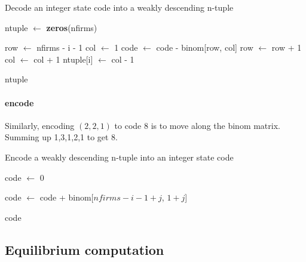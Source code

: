 \documentclass[12pt]{article}[margin=1in]
\begin{document}
\begin{algorithm}[!htbp]
    \caption{Decode an integer state code into a weakly descending n-tuple}
    \begin{algorithmic}[1]
        \State ntuple $\gets$ \textbf{zeros}(nfirms) 

        \State row $\gets$ nfirms - i - 1
        \State col $\gets$ 1
        \State code $\gets$ code - binom[row, col]
        \State row $\gets$ row + 1
        \State col $\gets$ col + 1
        \EndWhile
        \State ntuple[i] $\gets$ col - 1
        \EndFor

        \State \Return ntuple
        \EndFunction
    \end{algorithmic}
\end{algorithm}

\paragraph{encode}Similarly, encoding $(2,2,1)$ to code 8 is to move along the binom matrix. Summing up 1,3,1,2,1 to get 8.

\begin{algorithm}
    \caption{Encode a weakly descending n-tuple into an integer state code}
    \begin{algorithmic}[1]
        \State code $\gets$ 0 

        \State code $\gets$ code + binom[$nfirms - i - 1 + j$, $1 + j$]
        \EndFor
        \EndFor

        \State \Return code
        \EndFunction
    \end{algorithmic}
\end{algorithm}

\subsection{Equilibrium computation}
\end{document}
